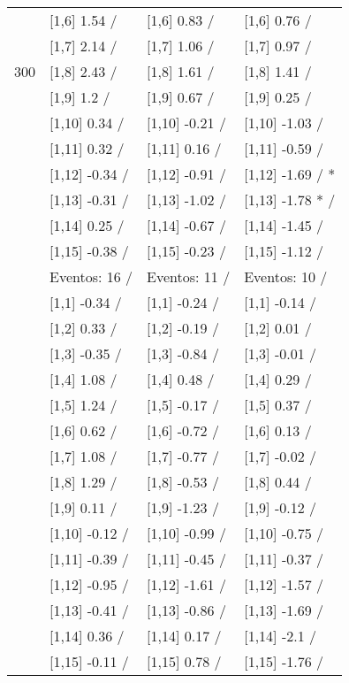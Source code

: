 \begin{table}
\begin{tabular}[t]{llll}
 & {}[1,6] 1.54  / & {}[1,6] 0.83  / & {}[1,6] 0.76  /\\
 & {}[1,7] 2.14  / & {}[1,7] 1.06  / & {}[1,7] 0.97  /\\
300 & {}[1,8] 2.43  / & {}[1,8] 1.61  / & {}[1,8] 1.41  /\\
\addlinespace
 & {}[1,9] 1.2  / & {}[1,9] 0.67  / & {}[1,9] 0.25  /\\
 & {}[1,10] 0.34  / & {}[1,10] -0.21  / & {}[1,10] -1.03  /\\
 & {}[1,11] 0.32  / & {}[1,11] 0.16  / & {}[1,11] -0.59  /\\
 & {}[1,12] -0.34  / & {}[1,12] -0.91  / & {}[1,12] -1.69  / *\\
 & {}[1,13] -0.31  / & {}[1,13] -1.02  / & {}[1,13] -1.78 * /\\
\addlinespace
 & {}[1,14] 0.25  / & {}[1,14] -0.67  / & {}[1,14] -1.45  /\\
 & {}[1,15] -0.38  / & {}[1,15] -0.23  / & {}[1,15] -1.12  /\\
 & Eventos:  16 / & Eventos:  11 / & Eventos:  10 /\\
 & {}[1,1] -0.34  / & {}[1,1] -0.24  / & {}[1,1] -0.14  /\\
 & {}[1,2] 0.33  / & {}[1,2] -0.19  / & {}[1,2] 0.01  /\\
\addlinespace
 & {}[1,3] -0.35  / & {}[1,3] -0.84  / & {}[1,3] -0.01  /\\
 & {}[1,4] 1.08  / & {}[1,4] 0.48  / & {}[1,4] 0.29  /\\
 & {}[1,5] 1.24  / & {}[1,5] -0.17  / & {}[1,5] 0.37  /\\
 & {}[1,6] 0.62  / & {}[1,6] -0.72  / & {}[1,6] 0.13  /\\
 & {}[1,7] 1.08  / & {}[1,7] -0.77  / & {}[1,7] -0.02  /\\
\addlinespace
500 & {}[1,8] 1.29  / & {}[1,8] -0.53  / & {}[1,8] 0.44  /\\
 & {}[1,9] 0.11  / & {}[1,9] -1.23  / & {}[1,9] -0.12  /\\
 & {}[1,10] -0.12  / & {}[1,10] -0.99  / & {}[1,10] -0.75  /\\
 & {}[1,11] -0.39  / & {}[1,11] -0.45  / & {}[1,11] -0.37  /\\
 & {}[1,12] -0.95  / & {}[1,12] -1.61  / & {}[1,12] -1.57  /\\
\addlinespace
 & {}[1,13] -0.41  / & {}[1,13] -0.86  / & {}[1,13] -1.69  /\\
 & {}[1,14] 0.36  / & {}[1,14] 0.17  / & {}[1,14] -2.1  /\\
 & {}[1,15] -0.11  / & {}[1,15] 0.78  / & {}[1,15] -1.76  /\\
\bottomrule
\end{tabular}
\end{table}
